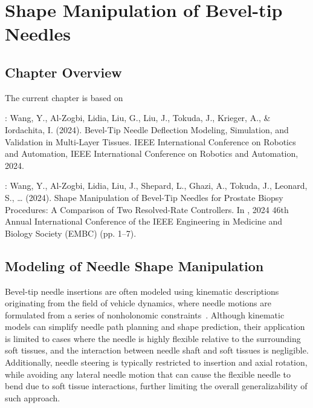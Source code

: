 \chapter{Shape Manipulation of Bevel-tip Needles} \label{chap:chap-4}

\section{Chapter Overview}
\label{sec:chap-4-overview}

The current chapter is based on

\parencite{wangBevelTipNeedleDeflection2024}:  Wang, Y., Al-Zogbi, Lidia, Liu, G., Liu, J., Tokuda, J., Krieger, A., \& Iordachita, I. (2024). Bevel-Tip Needle Deflection Modeling, Simulation, and Validation in Multi-Layer Tissues. IEEE International Conference on Robotics and Automation, IEEE International Conference on Robotics and Automation, 2024.

\parencite{wangShapeManipulationBevelTip2024}: Wang, Y., Al-Zogbi, Lidia, Liu, J., Shepard, L., Ghazi, A., Tokuda, J., Leonard, S., … (2024). Shape Manipulation of Bevel-Tip Needles for Prostate Biopsy Procedures: A Comparison of Two Resolved-Rate Controllers. In , 2024 46th Annual International Conference of the IEEE Engineering in Medicine and Biology Society (EMBC) (pp. 1–7).

\section{Modeling of Needle Shape Manipulation}
\label{sec:chap-4-model}

Bevel-tip needle insertions are often modeled using kinematic descriptions originating from the field of vehicle dynamics, where needle motions are formulated from a series of nonholonomic constraints~\parencite{parkDiffusionBasedMotionPlanning2005,websterNonholonomicModelingNeedle2006,alterovitzMotionPlanningUncertainty2008}. Although kinematic models can simplify needle path planning and shape prediction, their application is limited to cases where the needle is highly flexible relative to the surrounding soft tissues, and the interaction between needle shaft and soft tissues is negligible. Additionally, needle steering is typically restricted to insertion and axial rotation, while avoiding any lateral needle motion that can cause the flexible needle to bend due to soft tissue interactions, further limiting the overall generalizability of such approach.

